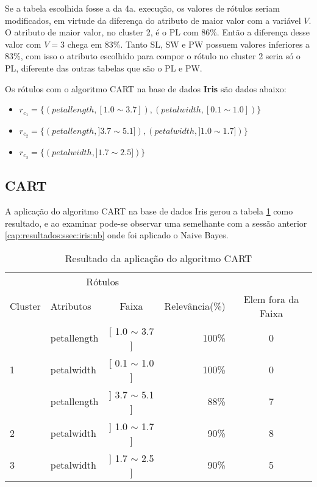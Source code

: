 Se a tabela escolhida fosse a da 4a. execução, os valores de rótulos seriam modificados, em virtude da diferença do atributo de maior valor com a variável ${V}$. O atributo de maior valor, no cluster 2, é o PL com 86\%. Então a diferença desse valor com ${V=3}$ chega em 83\%. Tanto SL, SW e PW possuem valores inferiores a 83\%, com isso o atributo escolhido para compor o rótulo  no cluster 2 seria só o PL, diferente das outras tabelas que são o PL e PW.

Os rótulos com o algoritmo CART na base de dados \textbf{Iris} são dados abaixo:
\begin{itemize}[noitemsep]
 \item ${r_{c_1}=\{ (petallength, [ 1.0 \sim 3.7]), (petalwidth,[ 0.1 \sim 1.0 ] ) \} }$  
 \item ${r_{c_2}=\{ (petallength, ] 3.7 \sim 5.1]), (petalwidth,] 1.0 \sim 1.7 ] )\} }$
 \item ${r_{c_3}=\{ (petalwidth, ] 1.7 \sim 2.5 ]) \} }$
\end{itemize}

\subsection{CART} \label{cap:resultados:ssec:iris:cart}

A aplicação do algoritmo CART na base de dados Iris gerou a tabela \ref{tab:rot:iris:cart} como resultado, e ao examinar pode-se observar uma semelhante com a sessão anterior \ref{cap:resultados:ssec:iris:nb} onde foi aplicado o Naive Bayes. 

\begin{table}[!h]
\centering
\caption{Resultado da aplicação do algoritmo CART}
\label{tab:rot:iris:cart}
\begin{tabular}{llcrc} \hline
 
\multicolumn{1}{c}{\cellcolor[HTML]{FFFFFF}} & \multicolumn{2}{c}{Rótulos}                & \multicolumn{1}{r}{}               & \\ \cline{2-3}
Cluster                                      & Atributos      & \multicolumn{1}{c}{Faixa} & \multicolumn{1}{c}{Relevância(\%)} & Elem fora da Faixa\\ \hline \hline
                                             & petallength    & [ 1.0 $\sim$  3.7 ]       & 100\%                               & 0 \\  
\multirow{-2}{*}{1}                          & petalwidth     & [ 0.1 $\sim$  1.0 ]       & 100\%                               & 0 \\  \hline
                                             & petallength    & ] 3.7 $\sim$  5.1 ]       & 88\%                               & 7\\ 
\multirow{-2}{*}{2}                          & petalwidth     & ] 1.0 $\sim$  1.7 ]       & 90\%                               & 8\\  \hline
3                                            & petalwidth     & ] 1.7 $\sim$  2.5 ]       & 90\%                               & 5\\ \hline \hline
\end{tabular}
\end{table}

